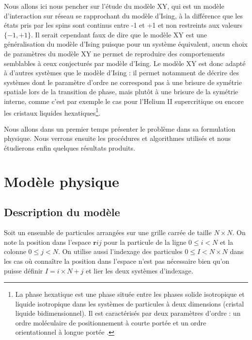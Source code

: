 \documentclass[a4paper, 11pt]{article}
\newcommand{\vr}{\bm{r}}
\begin{document}
Nous allons ici nous pencher sur l'étude du modèle XY, qui est un modèle d'interaction sur réseau se
rapprochant du modèle d'Ising, à la différence que les états pris par les spins sont continus entre
-1 et +1 et non restreints aux valeurs $\{-1, +1\}$. Il serait cependant faux de dire que le modèle
XY est une généralisation du modèle d'Ising puisque pour un système équivalent, aucun choix de
paramètres du modèle XY ne permet de reproduire des comportements semblables à ceux conjecturés par
modèle d'Ising. Le modèle XY est donc adapté à d'autres systèmes que le modèle d'Ising : il permet
notamment de décrire des systèmes dont le paramètre d'ordre ne correspond pas à une brisure de
symétrie spatiale lors de la transition de phase, mais plutôt à une brisure de la symétrie interne,
comme c'est par exemple le cas pour  l'Helium II supercritique ou encore les cristaux liquides
hexatiques\footnote{La phase hexatique est une phase située entre les phases solide isotropique et
liquide isotropique dans les systèmes de particules à deux dimensions (cristal liquide
bidimensionnel). Il est caractérisés par deux paramètres d'ordre : un ordre moléculaire de
positionnement à courte portée et un ordre orientationnel à longue portée
\cite{wiki:phase_hexatique}.}.

Nous allons dans un premier temps présenter le problème dans sa formulation physique. Nous verrons
ensuite les procédures et algorithmes utilisés et nous étudierons enfin quelques résultats produits.
 
\section{Modèle physique}

\subsection{Description du modèle}

Soit un ensemble de particules arrangées sur une grille carrée de taille $N\times N$. On note la
position dans l'espace $\vr{ij}$ pour la particule de la ligne $0 \le i < N$ et la colonne $0 \le j
< N$. On utilise aussi l'indexage des particules $0 \le I < N\times N$ dans les cas où connaître la
position dans l'espace n'est pas nécessaire bien qu'on puisse définir $I = i\times N +j$ et lier les
deux systèmes d'indexage. 
\end{document}
